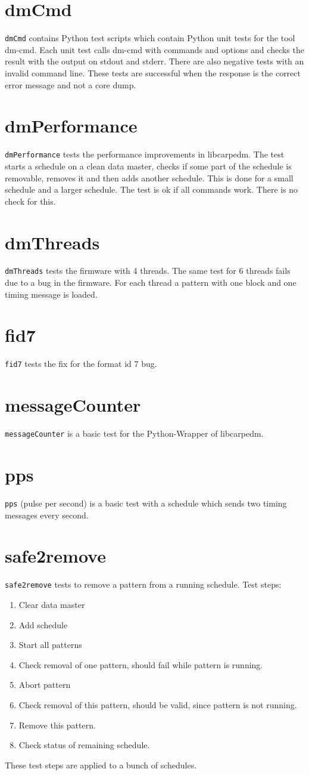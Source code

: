 \documentclass[12pt,a4paper]{report}
\begin{document}
\section{dmCmd}
\texttt{dmCmd} contains Python test scripts which contain Python unit tests for the tool dm-cmd. Each unit test calls dm-cmd
with commands and options and checks the result with the output on stdout and stderr. There are also negative tests with an invalid command
line. These tests are successful when the response is the correct error message and not a core dump.
\section{dmPerformance}
\texttt{dmPerformance} tests the performance improvements in libcarpedm.
The test starts a schedule on a clean data master, checks if some part of the schedule is removable, removes it and
then adds another schedule. This is done for a small schedule and a larger schedule. The test is ok if all commands
work. There is no check for this.
\section{dmThreads}
\texttt{dmThreads} tests the firmware with 4 threads. The same test for 6 threads fails due to a bug in the
firmware. For each thread a pattern with one block and one timing message is loaded.
\section{fid7}
\texttt{fid7} tests the fix for the format id 7 bug.

\section{messageCounter}
\texttt{messageCounter} is a basic test for the Python-Wrapper of libcarpedm.
\section{pps}
\texttt{pps} (pulse per second) is a basic test with a schedule which sends two timing messages every second.
\section{safe2remove}
\texttt{safe2remove} tests to remove a pattern from a running schedule. Test steps:
\begin{enumerate}
\item Clear data master
\item Add schedule
\item Start all patterns
\item Check removal of one pattern, should fail while pattern is running.
\item Abort pattern
\item Check removal of this pattern, should be valid, since pattern is not running.
\item Remove this pattern.
\item Check status of remaining schedule.
\end{enumerate}
These test steps are applied to a bunch of schedules.

\end{document}
